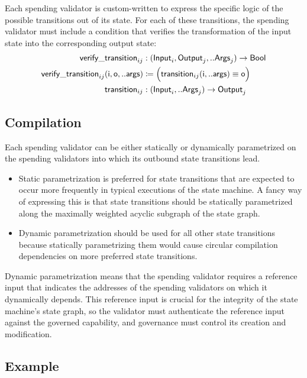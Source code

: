 \documentclass[../midgard.tex]{subfiles}
\begin{document}
Each spending validator is custom-written to express the specific logic of the possible transitions out of its state.
For each of these transitions, the spending validator must include a condition that verifies the transformation of the input state into the corresponding output state:
\begin{align*}
    \mathsf{verify\_transition}_{ij} &: (\mathsf{Input}_i, \mathsf{Output}_j, ..\mathsf{Args}_j) -> \mathsf{Bool} \\
    \mathsf{verify\_transition}_{ij}\mathsf{(i, o, ..args)} &\coloneq
        \Bigl( \mathsf{transition}_{ij}\mathsf{(i, ..args) \equiv \mathsf{o}} \Bigr) \\
    \mathsf{transition}_{ij} &: (\mathsf{Input}_i, ..\mathsf{Args}_j) -> \mathsf{Output}_j
\end{align*}

\subsection{Compilation}
\label{h:single-threaded-state-machine-compilation}

Each spending validator can be either statically or dynamically parametrized on the spending validators into which its outbound state transitions lead.

\begin{itemize}
    \item Static parametrization is preferred for state transitions that are expected to occur more frequently in typical executions of the state machine.
      A fancy way of expressing this is that state transitions should be statically parametrized along the maximally weighted acyclic subgraph of the state graph.
    \item Dynamic parametrization should be used for all other state transitions because statically parametrizing them would cause circular compilation dependencies on more preferred state transitions.
\end{itemize}

Dynamic parametrization means that the spending validator requires a reference input that indicates the addresses of the spending validators on which it dynamically depends.
This reference input is crucial for the integrity of the state machine's state graph, so the validator must authenticate the reference input against the governed capability, and governance must control its creation and modification.

\subsection{Example}
\label{h:single-threaded-state-machine-example}
\end{document}
